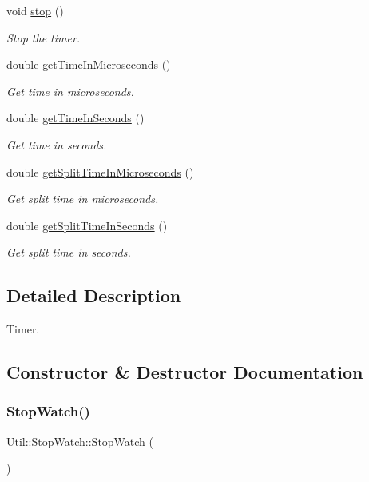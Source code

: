 \begin{DoxyCompactItemize}
void \mbox{\hyperlink{classUtil_1_1StopWatch_a8a89a1d02ece7c671ee1d9e9f42c88b2}{stop}} ()
\begin{DoxyCompactList}\small\item\em Stop the timer. \end{DoxyCompactList}\item 
double \mbox{\hyperlink{classUtil_1_1StopWatch_ab4de18812edf2336f96c52afcb0386b6}{get\+Time\+In\+Microseconds}} ()
\begin{DoxyCompactList}\small\item\em Get time in microseconds. \end{DoxyCompactList}\item 
double \mbox{\hyperlink{classUtil_1_1StopWatch_ab0bc68fe69855bd73f27cd8f4fa0a8c4}{get\+Time\+In\+Seconds}} ()
\begin{DoxyCompactList}\small\item\em Get time in seconds. \end{DoxyCompactList}\item 
double \mbox{\hyperlink{classUtil_1_1StopWatch_a5901023b831c6670d4184a9c6e85ff75}{get\+Split\+Time\+In\+Microseconds}} ()
\begin{DoxyCompactList}\small\item\em Get split time in microseconds. \end{DoxyCompactList}\item 
double \mbox{\hyperlink{classUtil_1_1StopWatch_aa0934b52920e4075317c6176675efb95}{get\+Split\+Time\+In\+Seconds}} ()
\begin{DoxyCompactList}\small\item\em Get split time in seconds. \end{DoxyCompactList}\end{DoxyCompactItemize}


\subsection{Detailed Description}
Timer. 

\subsection{Constructor \& Destructor Documentation}
\mbox{\label{classUtil_1_1StopWatch_a7eeb59348e5efff8490d2e8e95b0f126}} 
\subsubsection{\texorpdfstring{StopWatch()}{StopWatch()}\hspace{0.1cm}{\footnotesize\ttfamily [1/2]}}
{\footnotesize\ttfamily Util\+::\+Stop\+Watch\+::\+Stop\+Watch (\begin{DoxyParamCaption}{ }\end{DoxyParamCaption})}



